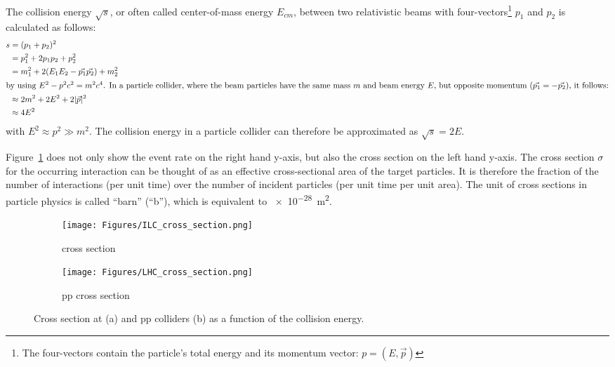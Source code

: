 The collision energy $\sqrt{s}$, or often called center-of-mass energy $E_{cm}$, between two relativistic beams with four-vectors\footnote{The four-vectors contain the particle's total energy and its momentum vector: $p = (E, \vec{p})$} $p_1$ and $p_2$ is calculated as follows:
\begin{align*}
 s &= (p_1+p_2)^2\\
 &=p_1^2+2p_1p_2+p_2^2\\
 &=m_1^2+2(E_1E_2-\vec{p_1}\vec{p_2})+m_2^2\\
\intertext{by using $E^2-p^2c^2=m^2c^4$. In a particle collider, where the beam particles have the same mass $m$ and beam energy $E$, but opposite momentum ($\vec{p_1}=-\vec{p_2}$), it follows:}
&\approx2m^2+2E^2+2|\vec{p}|^2\\
&\approx4E^2
\end{align*}
with $E^2\approx p^2 \gg m^2$.
The collision energy in a particle collider can therefore be approximated as $\sqrt{s}=2E$.

Figure~\ref{fig:Cross_sections} does not only show the event rate on the right hand y-axis, but also the cross section on the left hand y-axis.
The cross section $\sigma$ for the occurring interaction can be thought of as an effective cross-sectional area of the target particles.
It is therefore the fraction of the number of interactions (per unit time) over the number of incident particles (per unit time per unit area).
The unit of cross sections in particle physics is called ``barn'' (``b''), which is equivalent to \SI{e-28}{\meter\squared}.

\begin{figure}
\centering
\begin{subfigure}[b]{0.4\textwidth}
\texttt{[image: Figures/ILC\_cross\_section.png]}
\caption{\positron \electron cross section~\cite{ILC_cross}}
\end{subfigure}
\begin{subfigure}[b]{0.4\textwidth}
\texttt{[image: Figures/LHC\_cross\_section.png]}
\caption{pp cross section~\cite{LHC_cross}}
\end{subfigure}
\caption[Production cross sections for ILC and LHC]{Cross section at \positron \electron (a) and pp colliders (b) as a function of the collision energy. }%
\label{fig:Cross_sections}
\end{figure}

